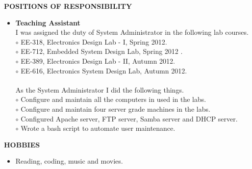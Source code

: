 \documentclass[a4paper,10pt]{article}
\begin{document}
 \colorbox{titleColor}{\parbox{6.5in}{\textbf{POSITIONS OF RESPONSIBILITY}}}

 \begin{itemize}
 \setlength{\itemsep}{1pt}
 \item \textbf{Teaching Assistant} \\
I was assigned the duty of System Administrator in the following lab courses.\\
$\circ$ EE-318, Electronics Design Lab - I, Spring 2012. \\
$\circ$ EE-712, Embedded System Design Lab, Spring 2012 . \\ 
$\circ$ EE-389, Electronics Design Lab - II, Autumn 2012.  \\
$\circ$ EE-616, Electronics System Design Lab, Autumn 2012. \\
\qquad \\
As the System Administrator I did the following things. \\
$\circ$ Configure and maintain all the computers in used in the labs. \\
$\circ$ Configure and maintain four server grade machines in the labs. \\
$\circ$ Configured Apache server, FTP server, Samba server and DHCP server. \\
$\circ$ Wrote a bash script to automate user maintenance.
 \end{itemize}

 \colorbox{titleColor}{\parbox{6.5in}{\textbf{HOBBIES}}}

  \begin{itemize}
 \setlength{\itemsep}{1pt}
    \item Reading, coding, music and movies.
  \end{itemize}
\end{document}
